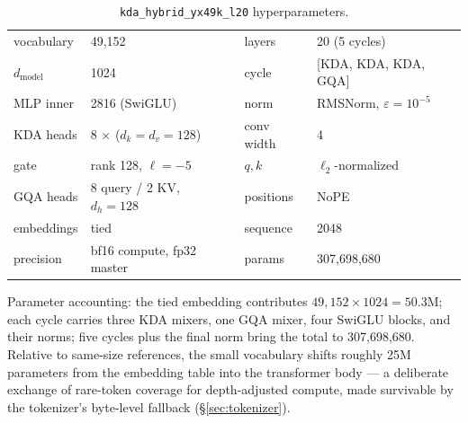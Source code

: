 \begin{table}[h]
\centering
\small
\caption{\texttt{kda\_hybrid\_yx49k\_l20} hyperparameters.}
\label{tab:hparams}
\begin{tabular}{llll}
\toprule
vocabulary & 49{,}152 & layers & 20 (5 cycles) \\
$d_{\mathrm{model}}$ & 1024 & cycle & [KDA, KDA, KDA, GQA] \\
MLP inner & 2816 (SwiGLU) & norm & RMSNorm, $\varepsilon{=}10^{-5}$ \\
KDA heads & 8 $\times$ ($d_k{=}d_v{=}128$) & conv width & 4 \\
gate & rank 128, $\ell = -5$ & $q,k$ & $\ell_2$-normalized \\
GQA heads & 8 query / 2 KV, $d_h{=}128$ & positions & NoPE \\
embeddings & tied & sequence & 2048 \\
precision & bf16 compute, fp32 master & params & 307{,}698{,}680 \\
\bottomrule
\end{tabular}
\end{table}

Parameter accounting: the tied embedding contributes
$49{,}152 \times 1024 = 50.3$M; each cycle carries three KDA mixers,
one GQA mixer, four SwiGLU blocks, and their norms; five cycles plus the
final norm bring the total to 307{,}698{,}680. Relative to same-size
references, the small vocabulary shifts roughly 25M parameters from the
embedding table into the transformer body --- a deliberate exchange of
rare-token coverage for depth-adjusted compute, made survivable by the
tokenizer's byte-level fallback (\S\ref{sec:tokenizer}).
